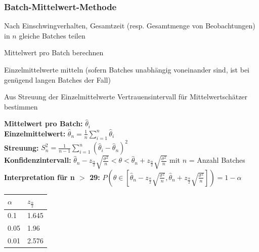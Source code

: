 \subsubsection{Batch-Mittelwert-Methode}
\begin{compactenum}
	\item Nach Einschwingverhalten, Gesamtzeit (resp. Gesamtmenge von Beobachtungen) in $n$ gleiche Batches teilen
	\item Mittelwert pro Batch berechnen
	\item Einzelmittelwerte mitteln (sofern Batches unabhängig voneinander sind, ist bei genügend langen Batches der Fall)
	\item Aus Streuung der Einzelmittelwerte Vertrauensintervall für Mittelwertschätzer bestimmen
\end{compactenum}
\begin{minipage}[h]{0.8\textwidth}
	\textbf{Mittelwert pro Batch:} $\hat{\theta}_i$\\
	\textbf{Einzelmittelwert:} $\hat{\theta}_n=\frac{1}{n}\sum_{i=1}^{n}\hat{\theta}_i$\\
	\textbf{Streuung:} $S_n^2=\frac{1}{n-1}\sum_{i=1}^{n}(\hat{\theta}_i-\hat{\theta}_n)^2$ \\
	\textbf{Konfidenzintervall:} $\hat{\theta}_n-z_{\frac{\alpha}{2}}\sqrt{\frac{\sigma^2}{n}} < \theta < \hat{\theta}_n+z_{\frac{\alpha}{2}}\sqrt{\frac{\sigma^2}{n}}$ mit $n$ = Anzahl Batches \\
	\textbf{Interpretation für n $>$ 29:} $P(\theta \in [\hat{\theta}_n-z_{\frac{\alpha}{2}}\sqrt{\frac{\sigma^2}{n}}, \hat{\theta}_n+z_{\frac{\alpha}{2}}\sqrt{\frac{\sigma^2}{n}}])=1-\alpha$
\end{minipage}
\begin{minipage}[h]{0.2\textwidth}
	\begin{tabular}{|l|l|}
		\hline
		$\alpha$ & $z_{\frac{\alpha}{2}}$ \\ \hline
		0.1 & 1.645 \\ \hline
		0.05 & 1.96 \\ \hline
		0.01 & 2.576 \\ \hline
	\end{tabular}
\end{minipage}	

